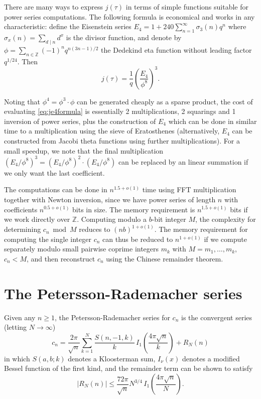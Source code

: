 \documentclass{amsart}
\theoremstyle{definition}
\theoremstyle{remark}
\begin{document}
There are many ways to express $j(\tau)$ in terms of
simple functions suitable for power series computations.
The following formula is economical and works in any characteristic:
define the Eisenstein series
$E_4 = 1 + 240 \sum_{n=1}^{\infty} \sigma_3(n) q^n$
where $\sigma_x(n)=\sum_{d\mid n} d^x$ is the divisor function,
and denote by
$\phi = \sum_{n \in \mathbb{Z}} (-1)^n q^{n(3n-1)/2}$
the Dedekind eta function without
leading factor $q^{1/24}$.
Then
\begin{equation}
j(\tau) = \frac{1}{q} \left(\frac{E_4}{\phi^8}\right)^3.
\label{eq:je4formula}
\end{equation}

Noting that $\phi^4 = \phi^3 \cdot \phi$ can be generated
cheaply as a sparse product, the cost of evaluating \eqref{eq:je4formula} is essentially 2 multiplications, 2 squarings and 1 inversion of power series,
plus the construction of $E_4$ which can be done
in similar time to a multiplication using the sieve of Eratosthenes
(alternatively, $E_4$ can be constructed from Jacobi theta functions using further multiplications).
For a small speedup, we note that the final multiplication $(E_4 / \phi^8)^3 = (E_4 / \phi^8)^2 \cdot (E_4 / \phi^8)$
can be replaced by an linear summation if we only want the last coefficient.

The computations can be done in $n^{1.5+o(1)}$ time using FFT multiplication together with Newton inversion,
since we have power series of length $n$ with coefficients $n^{0.5+o(1)}$ bits in size.
The memory requirement is $n^{1.5+o(1)}$ bits if we work
directly over $\mathbb{Z}$. 
Computing modulo a $b$-bit integer $M$, the complexity for determining $c_n \bmod M$ reduces to $(nb)^{1+o(1)}$.
The memory requirement
for computing the single integer $c_n$
can thus be reduced to $n^{1+o(1)}$
if we compute separately modulo small pairwise coprime integers $m_k$ with $M = m_1, \ldots, m_k$, $c_n < M$,
and then reconstruct $c_n$ using the Chinese remainder theorem.

\section{The Petersson-Rademacher series}

Given any $n \ge 1$, the Petersson-Rademacher series for $c_n$ is the convergent series (letting $N \to \infty$)
\begin{equation}
c_n = \frac{2 \pi }{\sqrt{n}} \sum_{k=1}^N \frac{S(n,-1,k)}{k} \,I_1\!\left(\frac{4 \pi \sqrt{n}}{k}\right) + R_N(n)
\label{eq:radseries}
\end{equation}
in which $S(a,b;k)$ denotes a Kloosterman sum, $I_{\nu}(x)$ denotes a modified Bessel function of the first kind,
and the remainder term can be shown to satisfy
\begin{equation}
|R_N(n)| \le \frac{72 \pi}{\sqrt{n}} N^{3/4} \,I_1\!\left(\frac{4 \pi \sqrt{n}}{N}\right).
\label{eq:rbound}
\end{equation}
\end{document}
